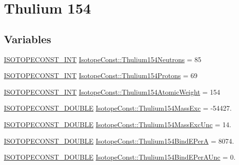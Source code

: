 \hypertarget{group___isotope_const-_thulium-_tm154}{}\section{Thulium 154}
\label{group___isotope_const-_thulium-_tm154}
\subsection*{Variables}
\begin{DoxyCompactItemize}
\item 
\mbox{\hyperlink{group___isotope_const-_macros_ga5f18360b3e99483a35c32d789e62621c}{I\+S\+O\+T\+O\+P\+E\+C\+O\+N\+S\+T\+\_\+\+I\+NT}} \mbox{\hyperlink{group___isotope_const-_thulium-_tm154_ga8c69617df958dc5798064086552e22e3}{Isotope\+Const\+::\+Thulium154\+Neutrons}} = 85
\item 
\mbox{\hyperlink{group___isotope_const-_macros_ga5f18360b3e99483a35c32d789e62621c}{I\+S\+O\+T\+O\+P\+E\+C\+O\+N\+S\+T\+\_\+\+I\+NT}} \mbox{\hyperlink{group___isotope_const-_thulium-_tm154_ga017d54e8014a8529d7495c8fc0adcc52}{Isotope\+Const\+::\+Thulium154\+Protons}} = 69
\item 
\mbox{\hyperlink{group___isotope_const-_macros_ga5f18360b3e99483a35c32d789e62621c}{I\+S\+O\+T\+O\+P\+E\+C\+O\+N\+S\+T\+\_\+\+I\+NT}} \mbox{\hyperlink{group___isotope_const-_thulium-_tm154_ga20a1c061a75c2290b81fb23532bf1ae0}{Isotope\+Const\+::\+Thulium154\+Atomic\+Weight}} = 154
\item 
\mbox{\hyperlink{group___isotope_const-_macros_ga8f45a7272ce02c0b4c65c44636ed719a}{I\+S\+O\+T\+O\+P\+E\+C\+O\+N\+S\+T\+\_\+\+D\+O\+U\+B\+LE}} \mbox{\hyperlink{group___isotope_const-_thulium-_tm154_ga7c1dc1cee9d60ea86b33acd907289c6c}{Isotope\+Const\+::\+Thulium154\+Mass\+Exc}} = -\/54427.
\item 
\mbox{\hyperlink{group___isotope_const-_macros_ga8f45a7272ce02c0b4c65c44636ed719a}{I\+S\+O\+T\+O\+P\+E\+C\+O\+N\+S\+T\+\_\+\+D\+O\+U\+B\+LE}} \mbox{\hyperlink{group___isotope_const-_thulium-_tm154_gaf028fbe5b44eb9d5e6b5947b4575254f}{Isotope\+Const\+::\+Thulium154\+Mass\+Exc\+Unc}} = 14.
\item 
\mbox{\hyperlink{group___isotope_const-_macros_ga8f45a7272ce02c0b4c65c44636ed719a}{I\+S\+O\+T\+O\+P\+E\+C\+O\+N\+S\+T\+\_\+\+D\+O\+U\+B\+LE}} \mbox{\hyperlink{group___isotope_const-_thulium-_tm154_gac52275e07f35d795e9d2a74e10532f4b}{Isotope\+Const\+::\+Thulium154\+Bind\+E\+PerA}} = 8074.
\item 
\mbox{\hyperlink{group___isotope_const-_macros_ga8f45a7272ce02c0b4c65c44636ed719a}{I\+S\+O\+T\+O\+P\+E\+C\+O\+N\+S\+T\+\_\+\+D\+O\+U\+B\+LE}} \mbox{\hyperlink{group___isotope_const-_thulium-_tm154_ga1de036b9d99be241348a8b7fd913c200}{Isotope\+Const\+::\+Thulium154\+Bind\+E\+Per\+A\+Unc}} = 0.

\end{DoxyCompactItemize}
